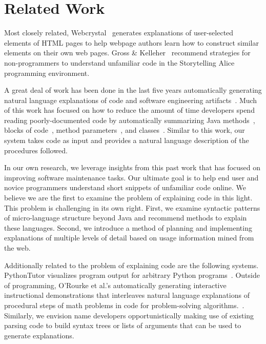 \section{Related Work}

Most closely related, Webcrystal~\cite{chang_webcrystal_2012} generates explanations of user-selected elements of HTML pages to help webpage authors learn how to construct similar elements on their own web pages.
Gross \& Kelleher~\cite{gross_non-programmers_2010} recommend strategies for non-programmers to understand unfamiliar code in the Storytelling Alice programming environment.

A great deal of work has been done in the last five years automatically generating natural language explanations of code and software engineering artifacts~\cite{sridhara_automatically_2011,burden_natural_2011,sridhara_towards_2010,kamimura_towards_2013,mcburney_automatic_2014,sridhara_generating_2011,haiduc_supporting_2010,moreno_automatic_2013}.
Much of this work has focused on how to reduce the amount of time developers spend reading poorly-documented code by automatically summarizing Java methods~\cite{sridhara_towards_2010}, blocks of code~\cite{sridhara_automatically_2011}, method parameters~\cite{sridhara_generating_2011}, and classes~\cite{moreno_automatic_2013}.
Similar to this work, our system takes code as input and provides a natural language description of the procedures followed.

In our own research, we leverage insights from this past work that has focused on improving software maintenance tasks.
Our ultimate goal is to help end user and novice programmers understand short snippets of unfamiliar code online.
We believe we are the first to examine the problem of explaining code in this light.
This problem is challenging in its own right.
First, we examine syntactic patterns of micro-language structure beyond Java and recommend methods to explain these languages.
Second, we introduce a method of planning and implementing explanations of multiple levels of detail based on usage information mined from the web.

Additionally related to the problem of explaining code are the following systems.
PythonTutor visualizes program output for arbitrary Python programs~\cite{guo_online_2013}.
Outside of programming, O'Rourke et al.'s automatically generating interactive instructional demonstrations that interleaves natural language explanations of procedural steps of math problems in code for problem-solving algorithms.~\cite{orourke_framework_2015}.
Similarly, we envision \gls{name} developers opportunistically making use of existing parsing code to build syntax trees or lists of arguments that can be used to generate explanations.

